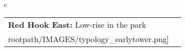 \begin{table}[H]
        \begin{tabular}{c}
        \begin{tabular}{m{1.5in} m{2in}}
\textbf{Red Hook East:} {Low-rise in the park} & \texttt{[image: \\rootpath/IMAGES/typology\_earlytower.png]}
\end{tabular}\end{tabular}
        \end{table}